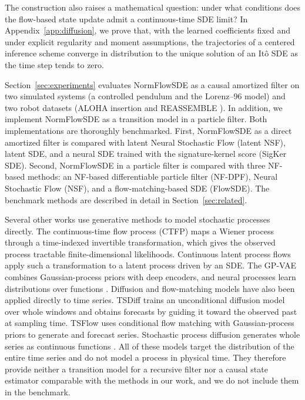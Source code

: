 The construction also raises a mathematical question: under what conditions does the flow-based state update admit a continuous-time SDE limit? In Appendix~\ref{app:diffusion}, we prove that, with the learned coefficients fixed and under explicit regularity and moment assumptions, the trajectories of a centered inference scheme converge in distribution to the unique solution of an It\^o SDE as the time step tends to zero. 

Section~\ref{sec:experiments} evaluates NormFlowSDE as a causal amortized filter on two simulated systems (a controlled pendulum and the Lorenz--96 model) and two robot datasets (ALOHA insertion \citep{zhao2023aloha} and REASSEMBLE \citep{sliwowski2025reassemble}). In addition, we implement NormFlowSDE as a transition model in a particle filter. Both implementations are thoroughly benchmarked. First, NormFlowSDE as a direct amortized filter is compared with latent Neural Stochastic Flow (latent NSF), latent SDE, and a neural SDE trained with the signature-kernel score (SigKer SDE). Second, NormFlowSDE in a particle filter is compared with three NF-based methods: an NF-based differentiable particle filter (NF-DPF), Neural Stochastic Flow (NSF), and a flow-matching-based SDE (FlowSDE). The benchmark methods are described in detail in Section~\ref{sec:related}. 

Several other works use generative methods to model stochastic processes directly. The continuous-time flow process (CTFP) \citep{deng2020ctfp} maps a Wiener process through a time-indexed invertible transformation, which gives the observed process tractable finite-dimensional likelihoods. Continuous latent process flows \citep{deng2021clpf} apply such a transformation to a latent process driven by an SDE. The GP-VAE \citep{fortuin2020gpvae} combines Gaussian-process priors with deep encoders, and neural processes learn distributions over functions \citep{garnelo2018neural}. Diffusion and flow-matching models have also been applied directly to time series. TSDiff \citep{kollovieh2023tsdiff} trains an unconditional diffusion model over whole windows and obtains forecasts by guiding it toward the observed past at sampling time. TSFlow \citep{kollovieh2025tsflow} uses conditional flow matching with Gaussian-process priors to generate and forecast series. Stochastic process diffusion generates whole series as continuous functions \citep{bilos2023stochastic}. All of these models target the distribution of the entire time series and do not model a process in physical time. They therefore provide neither a transition model for a recursive filter nor a causal state estimator comparable with the methods in our work, and we do not include them in the benchmark.
